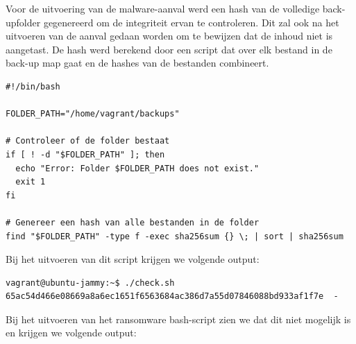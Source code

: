 Voor de uitvoering van de malware-aanval werd een hash van de volledige back-upfolder gegenereerd om de integriteit ervan te controleren. Dit zal ook na het uitvoeren van de aanval gedaan worden om te bewijzen dat de inhoud niet is aangetast. De hash werd berekend door een script dat over elk bestand in de back-up map gaat en de hashes van de bestanden combineert. 
\begin{lstlisting}[language=script, caption={Bash script om de hash te berekenen van de back-up map.}]
#!/bin/bash

FOLDER_PATH="/home/vagrant/backups"

# Controleer of de folder bestaat
if [ ! -d "$FOLDER_PATH" ]; then
  echo "Error: Folder $FOLDER_PATH does not exist."
  exit 1
fi

# Genereer een hash van alle bestanden in de folder
find "$FOLDER_PATH" -type f -exec sha256sum {} \; | sort | sha256sum
\end{lstlisting}
Bij het uitvoeren van dit script krijgen we volgende output:
\begin{lstlisting}[language=code, caption={Output van het script om de hash te berekenen.}]
vagrant@ubuntu-jammy:~$ ./check.sh
65ac54d466e08669a8a6ec1651f6563684ac386d7a55d07846088bd933af1f7e  -
\end{lstlisting}
Bij het uitvoeren van het ransomware bash-script zien we dat dit niet mogelijk is en krijgen we volgende output:
